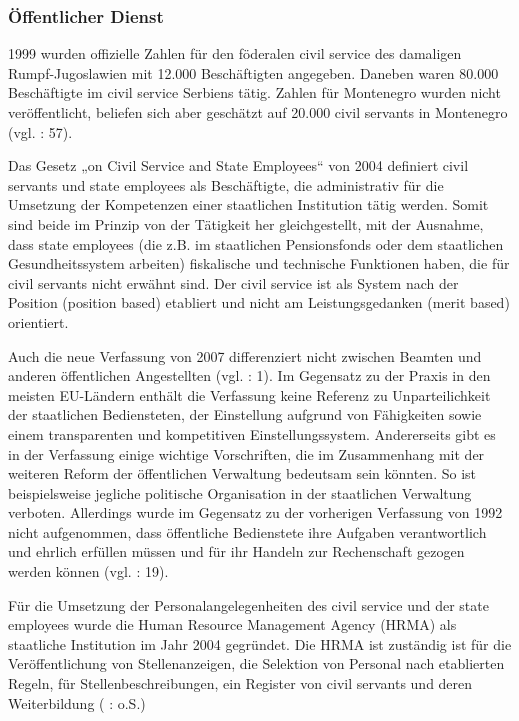 \subsubsection{Öffentlicher Dienst }
1999 wurden offizielle Zahlen für den föderalen civil service des damaligen Rumpf-Jugoslawien mit 12.000 Beschäftigten angegeben. Daneben waren 80.000 Beschäftigte im civil service Serbiens tätig. Zahlen für Montenegro wurden nicht veröffentlicht, beliefen sich aber geschätzt auf 20.000 civil servants in Montenegro (vgl. \cite{sevic} : 57).\par
Das Gesetz „on Civil Service and State Employees“ von 2004 definiert civil servants und state employees als Beschäftigte, die administrativ für die Umsetzung der Kompetenzen einer staatlichen Institution tätig werden. Somit sind beide im Prinzip von der Tätigkeit her gleichgestellt, mit der Ausnahme, dass state employees (die z.B. im staatlichen Pensionsfonds oder dem staatlichen Gesundheitssystem arbeiten) fiskalische und technische Funktionen haben, die für civil servants nicht erwähnt sind. Der civil service ist als System nach der Position (position based) etabliert und nicht am Leistungsgedanken (merit based) orientiert. \par
Auch die neue Verfassung von 2007 differenziert nicht zwischen Beamten und anderen öffentlichen Angestellten (vgl. \cite{oecd08c} : 1). Im Gegensatz zu der Praxis in den meisten EU-Ländern enthält die Verfassung keine Referenz zu Unparteilichkeit der staatlichen Bediensteten, der Einstellung aufgrund von Fähigkeiten sowie einem transparenten und kompetitiven Einstellungssystem. Andererseits gibt es in der Verfassung einige wichtige Vorschriften, die im Zusammenhang mit der weiteren Reform der öffentlichen Verwaltung bedeutsam sein könnten. So ist beispielsweise jegliche politische Organisation in der staatlichen Verwaltung verboten. Allerdings wurde im Gegensatz zu der vorherigen Verfassung von 1992 nicht aufgenommen, dass öffentliche Bedienstete ihre Aufgaben verantwortlich und ehrlich erfüllen müssen und für ihr Handeln zur Rechenschaft gezogen werden können (vgl. \cite{dzamuk} : 19). \par
Für die Umsetzung der Personalangelegenheiten des civil service und der state employees wurde die Human Resource Management Agency (HRMA) als staatliche Institution im Jahr 2004 gegründet. Die HRMA ist zuständig ist für die Veröffentlichung von Stellenanzeigen, die Selektion von Personal nach etablierten Regeln, für Stellenbeschreibungen, ein Register von civil servants und deren Weiterbildung (\cite{vukovic} : o.S.)\par	
